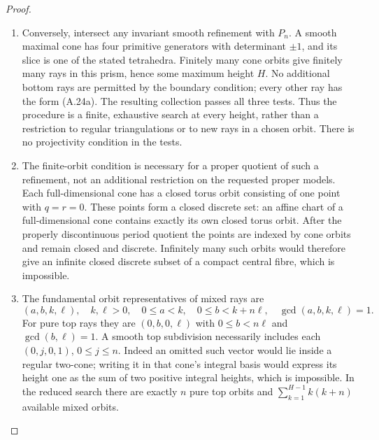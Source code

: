 \begin{proof}
\begin{enumerate}[label=\arabic*.,leftmargin=*]
\item Conversely, intersect any invariant smooth refinement with
$P_n$. A smooth maximal cone has four primitive generators
with determinant $\pm1$, and its slice is one of the stated
tetrahedra. Finitely many cone orbits give finitely many rays
in this prism, hence some maximum height $H$. No additional
bottom rays are permitted by the boundary condition; every
other ray has the form (A.24a). The resulting collection
passes all three tests. Thus the procedure is a finite,
exhaustive search at every height, rather than a restriction
to regular triangulations or to new rays in a chosen orbit.
There is no projectivity condition in the tests.

\item The finite-orbit condition is necessary for a proper quotient
of such a refinement, not an additional restriction on the
requested proper models. Each full-dimensional cone has a
closed torus orbit consisting of one point with $q=r=0$.
These points form a closed discrete set: an affine chart
of a full-dimensional cone contains exactly its own closed
torus orbit. After the properly discontinuous period
quotient the points are indexed by cone orbits and remain
closed and discrete. Infinitely many such orbits would
therefore give an infinite closed discrete subset of a
compact central fibre, which is impossible.

\item The fundamental orbit representatives of mixed rays are
\[
 (a,b,k,\ell),\quad k,\ell>0,
 \quad0\leq a<k,\quad0\leq b<k+n\ell,
 \quad\gcd(a,b,k,\ell)=1.
 \tag{A.24c}
\]
For pure top rays they are $(0,b,0,\ell)$ with
$0\leq b<n\ell$ and $\gcd(b,\ell)=1$. A smooth top
subdivision necessarily includes each $(0,j,0,1)$,
$0\leq j\leq n$. Indeed an omitted such vector would lie
inside a regular two-cone; writing it in that cone's integral
basis would express its height one as the sum of two
positive integral heights, which is impossible.
In the reduced search there are exactly $n$ pure top orbits
and $\sum_{k=1}^{H-1}k(k+n)$ available mixed orbits.


\end{enumerate}
\end{proof}
